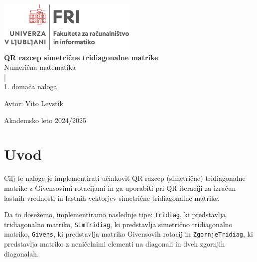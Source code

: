 \documentclass[11pt, titlepage]{article}
\begin{document}
\begin{titlepage}
    \begin{center}
        \includegraphics[width=0.5\textwidth]{figures/FRI_logo.png}\\
        \vspace{0.5cm}
        \vspace{3cm}
        {\LARGE \bf QR razcep simetrične tridiagonalne matrike} \\
        \vspace{0.3cm}
        \vspace{2.0cm}
        {\large Numerična matematika}\\
        \vspace{0.2cm}
        {|}\\
        \vspace{0.2cm}
        {\large 1. domača naloga}\\
        \vspace{2.0cm}
    \end{center}
    \vfill
    \begin{flushleft}
        {\normalsize {\sf Avtor:} Vito Levstik\\}
    \end{flushleft}
    \vspace{2cm}
    \begin{center}
        {\normalsize \sc Akademsko leto 2024/2025}
    \end{center}
\end{titlepage}

\newpage

\section{Uvod}

Cilj te naloge je implementirati učinkovit QR razcep (simetrične) tridiagonalne matrike z Givensovimi rotacijami 
in ga uporabiti pri QR iteraciji za izračun lastnih vrednosti in lastnih vektorjev simetrične tridiagonalne matrike.

Da to dosežemo, implementiramo naslednje tipe: \texttt{Tridiag}, ki predstavlja tridiagonalno matriko,
\texttt{SimTridiag}, ki predstavlja simetrično tridiagonalno matriko, \texttt{Givens}, ki predstavlja matriko Givensovih rotacij in
\texttt{ZgornjeTridiag}, ki predstavlja matriko z neničelnimi elementi na diagonali in dveh zgornjih diagonalah.
\end{document}
